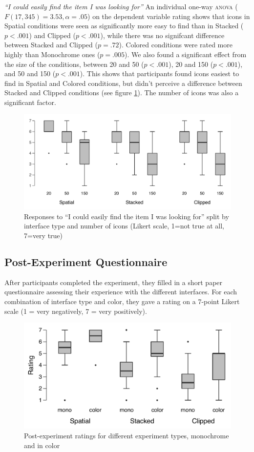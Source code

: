 \documentclass[nobib]{tufte-book} %
\begin{document}
\emph{``I could easily find the item I was looking for''}
An individual one-way \textsc{anova} ($F(17,345) = 3.53, \alpha = .05$) on the dependent variable rating shows that icons in Spatial conditions were seen as significantly more easy to find than in Stacked ($p < .001$) and Clipped ($p < .001$), while there was no signifcant difference between Stacked and Clipped ($p = .72$). Colored conditions were rated more highly than Monochrome ones ($p = .005$). We also found a significant effect from the size of the conditions, between 20 and 50 ($p < .001$), 20 and 150 ($p < .001$), and 50 and 150 ($p < .001$). This shows that participants found icons easiest to find in Spatial and Colored conditions, but didn't perceive a difference between Stacked and Clipped conditions (see figure \ref{fig:easyfind}). The number of icons was also a significant factor.

\begin{figure}
\includegraphics{postcon-easy.pdf}
\caption{Responses to ``I could easily find the item I was looking for'' split by interface type and number of icons (Likert scale, 1=not true at all, 7=very true)}
\label{fig:easyfind}
\end{figure}


\subsection{Post-Experiment Questionnaire}
After participants completed the experiment, they filled in a short paper questionnaire assessing their experience with the different interfaces. For each combination of interface type and color, they gave a rating on a 7-point Likert scale (1 = very negatively, 7 = very positively).

\begin{figure}
  \includegraphics{post-color.pdf}
  \caption{Post-experiment ratings for different experiment types, monochrome and in color}
  \label{fig:post-color}
\end{figure}
\end{document}
